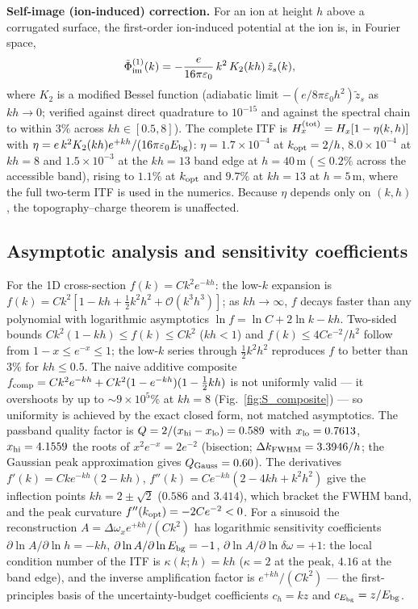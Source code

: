 \documentclass[12pt,a4paper]{article}
\begin{document}
\textbf{Self-image (ion-induced) correction.}  For an ion at height $h$
above a corrugated surface, the first-order ion-induced potential at the
ion is, in Fourier space,
\begin{equation}
\tilde{\Phi}^{(1)}_{\rm im}(k) = -\frac{e}{16\pi\varepsilon_0}\,
    k^2\,K_2(kh)\,\tilde{z}_s(k),
\end{equation}
where $K_2$ is a modified Bessel function (adiabatic limit
$-(e/8\pi\varepsilon_0h^2)\tilde z_s$ as $kh\to0$; verified against direct
quadrature to $10^{-15}$ and against the spectral chain to within $3\%$
across $kh\in[0.5,8]$).  The complete ITF is
$H_x^{\rm(tot)}=H_x[1-\eta(k,h)]$ with
$\eta=e\,k^2K_2(kh)e^{+kh}/(16\pi\varepsilon_0E_{\rm bg})$:
$\eta=1.7\times10^{-4}$ at $k_{\rm opt}=2/h$, $8.0\times10^{-4}$ at
$kh=8$ and $1.5\times10^{-3}$ at the $kh=13$ band edge at
$h=40$\,\textmu m ($\le0.2\%$ across the accessible band), rising to
$1.1\%$ at $k_{\rm opt}$ and $9.7\%$ at $kh=13$ at $h=5$\,\textmu m,
where the full two-term ITF is used in the numerics.  Because $\eta$
depends only on $(k,h)$, the topography--charge theorem is unaffected.

\subsection{Asymptotic analysis and sensitivity coefficients}

For the 1D cross-section $f(k)=Ck^2e^{-kh}$: the low-$k$ expansion is
$f(k)=Ck^2[1-kh+\tfrac12k^2h^2+\mathcal{O}(k^3h^3)]$; as $kh\to\infty$,
$f$ decays faster than any polynomial with logarithmic asymptotics
$\ln f=\ln C+2\ln k-kh$.  Two-sided bounds $Ck^2(1-kh)\le f(k)\le Ck^2$
($kh<1$) and $f(k)\le4Ce^{-2}/h^2$ follow from $1-x\le e^{-x}\le1$; the
low-$k$ series through $\tfrac12k^2h^2$ reproduces $f$ to better than
$3\%$ for $kh\le0.5$.  The naive additive composite
$f_{\rm comp}=Ck^2e^{-kh}+Ck^2(1-e^{-kh})(1-\tfrac12kh)$ is not
uniformly valid --- it overshoots by up to ${\sim}9\times10^5\%$ at
$kh=8$ (Fig.~\ref{fig:S_composite}) --- so uniformity is achieved by the
exact closed form, not matched asymptotics.  The passband quality factor
is $Q=2/(x_{\rm hi}-x_{\rm lo})=0.589$ with $x_{\rm lo}=0.7613$,
$x_{\rm hi}=4.1559$ the roots of $x^2e^{-x}=2e^{-2}$ (bisection;
$\Delta k_{\rm FWHM}=3.3946/h$; the Gaussian peak approximation gives
$Q_{\rm Gauss}=0.60$).  The derivatives
$f'(k)=Cke^{-kh}(2-kh)$, $f''(k)=Ce^{-kh}(2-4kh+k^2h^2)$ give the
inflection points $kh=2\pm\sqrt2$ ($0.586$ and $3.414$), which bracket
the FWHM band, and the peak curvature $f''(k_{\rm opt})=-2Ce^{-2}<0$.
For a sinusoid the reconstruction $A=\Delta\omega_x e^{+kh}/(Ck^2)$ has
logarithmic sensitivity coefficients
$\partial\ln A/\partial\ln h=-kh$,
$\partial\ln A/\partial\ln E_{\rm bg}=-1$,
$\partial\ln A/\partial\ln\delta\omega=+1$: the local condition number of
the ITF is $\kappa(k;h)=kh$ ($\kappa=2$ at the peak, $4.16$ at the band
edge), and the inverse amplification factor is $e^{+kh}/(Ck^2)$ --- the
first-principles basis of the uncertainty-budget coefficients
$c_h=kz$ and $c_{E_{\rm bg}}=z/E_{\rm bg}$.
\end{document}
